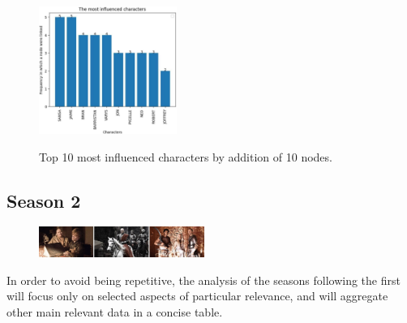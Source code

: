 \documentclass[10pt,twocolumn,letterpaper]{article}
\begin{document}
\begin{figure}[!h]
    \centering
    \includegraphics[width=0.4\textwidth]{img/s1/link_pred_chart.jpg}
    \vspace{0.2cm}\\
    \caption{\small{Top 10 most influenced characters by addition of 10 nodes.}}
\end{figure}


\subsection{Season 2}

\begin{figure}[!h]
    \includegraphics[width=0.48\textwidth]{img/s2/frames_s2.jpg}
\end{figure}

In order to avoid being repetitive, the analysis of the seasons following the first will focus only on selected aspects of particular relevance, and will aggregate other main relevant data in a concise table.
\end{document}
